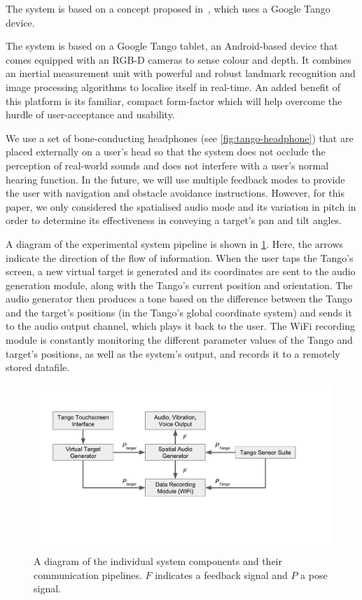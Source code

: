 \documentclass[sigconf, screen=true, anonymous=true]{acmart}
\begin{document}
\begin{anonsuppress}
The system is based on a concept proposed in~\cite{bellotto2013, lock2017portable}, which uses a Google Tango device.
\end{anonsuppress}
The system is based on a Google Tango tablet, an Android-based device that comes equipped with an RGB-D cameras to sense colour and depth.
It combines an inertial measurement unit with powerful and robust landmark recognition and image processing algorithms to localise itself in real-time.
An added benefit of this platform is its familiar, compact form-factor which will help overcome the hurdle of user-acceptance and usability.

We use a set of bone-conducting headphones (see \cref{fig:tango-headphone}) that are placed externally on a user's head so that the system does not occlude the perception of real-world sounds and does not interfere with a user's normal hearing function.
In the future, we will use multiple feedback modes to provide the user with navigation and obstacle avoidance instructions.
However, for this paper, we only considered the spatialised audio mode and its variation in pitch in order to determine its effectiveness in conveying a target's pan and tilt angles.

A diagram of the experimental system pipeline is shown in \cref{fig:pipeline}.
Here, the arrows indicate the direction of the flow of information.
When the user taps the Tango's screen, a new virtual target is generated and its coordinates are sent to the audio generation module, along with the Tango's current position and orientation.
The audio generator then produces a tone based on the difference between the Tango and the target's positions (in the Tango's global coordinate system) and sends it to the audio output channel, which plays it back to the user.
The WiFi recording module is constantly monitoring the different parameter values of the Tango and target's positions, as well as the system's output, and records it to a remotely stored datafile. 

\begin{figure}
  \centering
  \includegraphics[clip=true, trim=0 120 80 50, width=1.0\columnwidth]{figures/pipeline.pdf}
  \caption{A diagram of the individual system components and their communication pipelines. $F$ indicates a feedback signal and $P$ a pose signal. }\label{fig:pipeline}
\end{figure}
\end{document}
